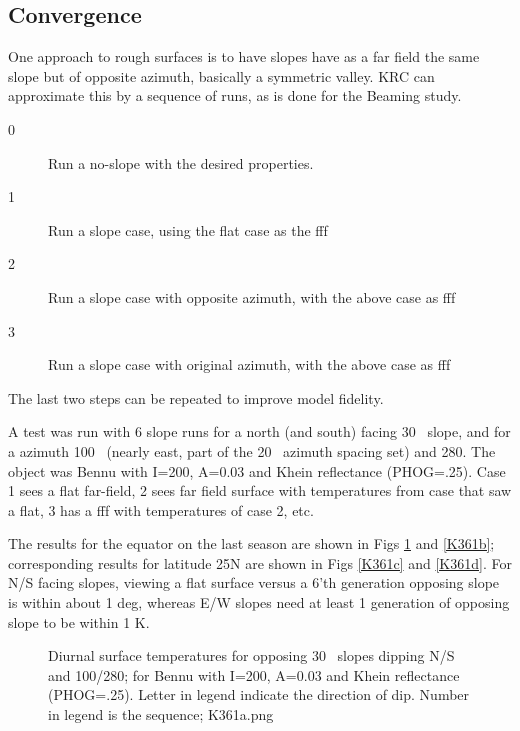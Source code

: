 \subsection{Convergence}

One approach to rough surfaces is to have slopes have as a far field the same slope but of opposite azimuth, basically a symmetric valley. KRC can approximate this by a sequence of runs, as is done for the Beaming study.

\begin{description}    %
 \item [0] Run a no-slope with the desired properties.
 \item [1] Run a slope case, using the flat case as the fff
 \item [2] Run a slope case with opposite azimuth, with the above case as fff
 \item [3] Run a slope case with original azimuth, with the above case as fff
\end{description}

The last two steps can be repeated to improve model fidelity.  

A test was run with 6 slope runs for a north (and south) facing 30\qd~ slope,
and for a azimuth 100\qd~ (nearly east, part of the 20\qd~ azimuth spacing set)
and 280\qd. The object was Bennu with I=200, A=0.03 and Khein reflectance
(PHOG=.25). Case 1 sees a flat far-field, 2 sees far field surface with temperatures from case that saw a flat, 3 has a fff with temperatures of case 2, etc.

The results for the equator on the last season are shown in Figs \ref{K361a}
and \ref{K361b}; corresponding results for latitude 25N are shown in
Figs \ref{K361c} and \ref{K361d}. For N/S facing slopes, viewing a flat surface versus a 6'th generation opposing slope is within about 1 deg, whereas E/W slopes need at least 1 generation of opposing slope to be within 1 K. 


 
\begin{figure}[!ht] 
\caption[Valley temperatures]{Diurnal surface temperatures for opposing 30\qd~ slopes dipping N/S and 100/280\qd; for Bennu with I=200, A=0.03 and Khein reflectance
(PHOG=.25). Letter in legend indicate the direction of dip. Number in legend is
the sequence;
\label{K361a}  K361a.png  }
\end{figure} 

